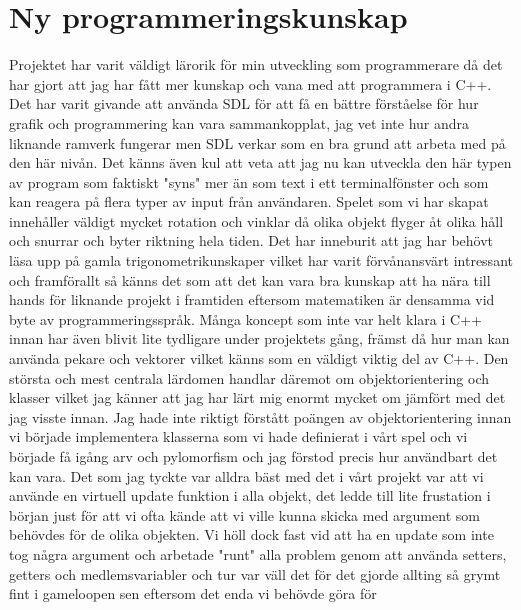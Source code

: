 \documentclass{TDP003mall}
\begin{document}
\section{Ny programmeringskunskap}
Projektet har varit väldigt lärorik för min utveckling som programmerare då det har gjort att jag har fått mer kunskap och vana 
med att programmera i C++. Det har varit givande att använda SDL för att få en bättre förståelse för hur grafik
och programmering kan vara sammankopplat, jag vet inte hur andra liknande ramverk fungerar men SDL verkar som en bra grund
att arbeta med på den här nivån. Det känns även kul att veta att jag nu kan utveckla den här typen av program som faktiskt "syns"
mer än som text i ett terminalfönster och som kan reagera på flera typer av input från användaren. \newline  \newline 
Spelet som vi har skapat innehåller väldigt mycket rotation och vinklar då olika objekt flyger åt olika håll och snurrar och byter 
riktning hela tiden. Det har inneburit att jag har behövt läsa upp på gamla trigonometrikunskaper vilket har varit förvånansvärt intressant
och framförallt så känns det som att det kan vara bra kunskap att ha nära till hands för liknande projekt i framtiden eftersom
matematiken är densamma vid byte av programmeringsspråk.  \newline \newline 
Många koncept som inte var helt klara i C++ innan har även blivit lite tydligare under projektets gång, främst då hur man kan använda pekare och 
vektorer vilket känns som en väldigt viktig del av C++. \newline \newline
Den största och mest centrala lärdomen handlar däremot om objektorientering och klasser vilket jag känner att jag har lärt mig enormt mycket om
jämfört med det jag visste innan. Jag hade inte riktigt förstått poängen av objektorientering innan vi började implementera klasserna
som vi hade definierat i vårt spel och vi började få igång arv och pylomorfism och jag förstod precis hur användbart det kan vara. 
Det som jag tyckte var alldra bäst med det i vårt projekt var att vi använde en virtuell update funktion i alla objekt, det ledde
till lite frustation i början just för att vi ofta kände att vi ville kunna skicka med argument som behövdes för de olika objekten. 
Vi höll dock fast vid att ha en update som inte tog några argument och arbetade "runt" alla problem genom att använda setters, getters 
och medlemsvariabler och tur var väll det för det gjorde allting så grymt fint i gameloopen sen eftersom det enda vi behövde göra för 
\end{document}
